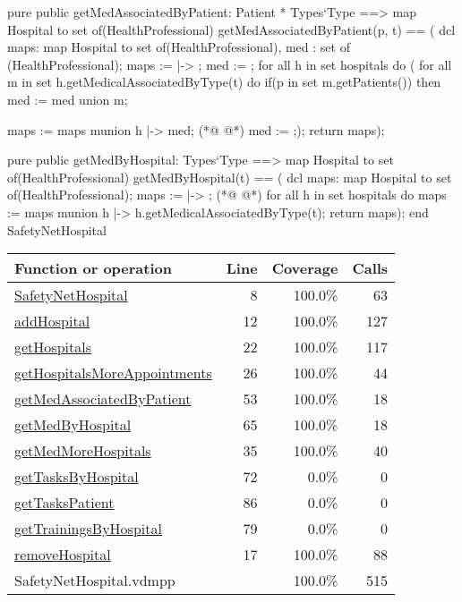 \begin{vdmpp}[breaklines=true]
 pure public getMedAssociatedByPatient: Patient * Types`Type ==> map Hospital to set of(HealthProfessional)
  getMedAssociatedByPatient(p, t) == (
                     dcl maps: map Hospital to set of(HealthProfessional), med : set of (HealthProfessional);
                     maps := { |-> };
                     med := {};
                     for all h in set hospitals do (
                      for all m in set h.getMedicalAssociatedByType(t) do
                       if(p in set m.getPatients())
                        then med := med union {m};
                       
                      maps := maps munion {h |-> med};
(*@
\label{getMedByHospital:65}
@*)
                      med := {};);
                      return maps);
 
 pure public getMedByHospital: Types`Type ==> map Hospital to set of(HealthProfessional)
  getMedByHospital(t) == (
                     dcl maps: map Hospital to set of(HealthProfessional);
                     maps := { |-> };
(*@
\label{getTasksByHospital:72}
@*)
                     for all h in set hospitals do
                      maps := maps munion {h |-> h.getMedicalAssociatedByType(t)};
                     return maps);
end SafetyNetHospital
\end{vdmpp}
\bigskip
\begin{longtable}{|l|r|r|r|}
\hline
Function or operation & Line & Coverage & Calls \\
\hline
\hline
\hyperref[SafetyNetHospital:8]{SafetyNetHospital} & 8&100.0\% & 63 \\
\hline
\hyperref[addHospital:12]{addHospital} & 12&100.0\% & 127 \\
\hline
\hyperref[getHospitals:22]{getHospitals} & 22&100.0\% & 117 \\
\hline
\hyperref[getHospitalsMoreAppointments:26]{getHospitalsMoreAppointments} & 26&100.0\% & 44 \\
\hline
\hyperref[getMedAssociatedByPatient:53]{getMedAssociatedByPatient} & 53&100.0\% & 18 \\
\hline
\hyperref[getMedByHospital:65]{getMedByHospital} & 65&100.0\% & 18 \\
\hline
\hyperref[getMedMoreHospitals:35]{getMedMoreHospitals} & 35&100.0\% & 40 \\
\hline
\hyperref[getTasksByHospital:72]{getTasksByHospital} & 72&0.0\% & 0 \\
\hline
\hyperref[getTasksPatient:86]{getTasksPatient} & 86&0.0\% & 0 \\
\hline
\hyperref[getTrainingsByHospital:79]{getTrainingsByHospital} & 79&0.0\% & 0 \\
\hline
\hyperref[removeHospital:17]{removeHospital} & 17&100.0\% & 88 \\
\hline
\hline
SafetyNetHospital.vdmpp & & 100.0\% & 515 \\
\hline
\end{longtable}

